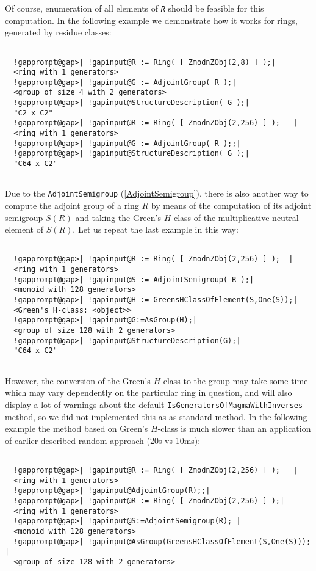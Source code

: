 \documentclass[a4paper,11pt]{report}
\begin{document}
{{{ Of course, enumeration of all elements of \mbox{\texttt{\mdseries\slshape R}} should be feasible for this computation. In the following example we
demonstrate how it works for rings, generated by residue classes: 
\begin{Verbatim}[commandchars=!@|,fontsize=\small,frame=single,label=Example]
  
  !gapprompt@gap>| !gapinput@R := Ring( [ ZmodnZObj(2,8) ] );|
  <ring with 1 generators>
  !gapprompt@gap>| !gapinput@G := AdjointGroup( R );|
  <group of size 4 with 2 generators>
  !gapprompt@gap>| !gapinput@StructureDescription( G );|
  "C2 x C2"
  !gapprompt@gap>| !gapinput@R := Ring( [ ZmodnZObj(2,256) ] );   |
  <ring with 1 generators>
  !gapprompt@gap>| !gapinput@G := AdjointGroup( R );;|
  !gapprompt@gap>| !gapinput@StructureDescription( G );|
  "C64 x C2"
  
\end{Verbatim}
 Due to the \texttt{AdjointSemigroup} (\ref{AdjointSemigroup}), there is also another way to compute the adjoint group of a ring $R$ by means of the computation of its adjoint semigroup $S(R)$ and taking the Green's $H$-class of the multiplicative neutral element of $S(R)$. Let us repeat the last example in this way: 
\begin{Verbatim}[commandchars=!@|,fontsize=\small,frame=single,label=Example]
  
  !gapprompt@gap>| !gapinput@R := Ring( [ ZmodnZObj(2,256) ] );  |
  <ring with 1 generators>
  !gapprompt@gap>| !gapinput@S := AdjointSemigroup( R );|
  <monoid with 128 generators>
  !gapprompt@gap>| !gapinput@H := GreensHClassOfElement(S,One(S));|
  <Green's H-class: <object>>
  !gapprompt@gap>| !gapinput@G:=AsGroup(H);|
  <group of size 128 with 2 generators>
  !gapprompt@gap>| !gapinput@StructureDescription(G);|
  "C64 x C2"
  
\end{Verbatim}
 However, the conversion of the Green's $H$-class to the group may take some time which may vary dependently on the
particular ring in question, and will also display a lot of warnings about the
default \texttt{IsGeneratorsOfMagmaWithInverses} method, so we did not implemented this as as standard method. In the following
example the method based on Green's $H$-class is much slower than an application of earlier described random approach
(20s vs 10ms): 
\begin{Verbatim}[commandchars=!@|,fontsize=\small,frame=single,label=Example]
  
  !gapprompt@gap>| !gapinput@R := Ring( [ ZmodnZObj(2,256) ] );   |
  <ring with 1 generators>
  !gapprompt@gap>| !gapinput@AdjointGroup(R);;|
  !gapprompt@gap>| !gapinput@R := Ring( [ ZmodnZObj(2,256) ] );|
  <ring with 1 generators>
  !gapprompt@gap>| !gapinput@S:=AdjointSemigroup(R); |
  <monoid with 128 generators>
  !gapprompt@gap>| !gapinput@AsGroup(GreensHClassOfElement(S,One(S))); |
  <group of size 128 with 2 generators>
  

\end{Verbatim}}}}
\end{document}
